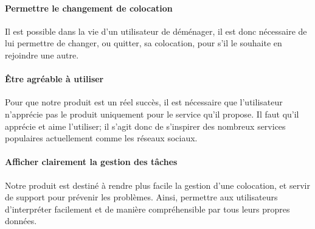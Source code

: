 \paragraph{Permettre le changement de colocation\\}
Il est possible dans la vie d'un utilisateur de déménager, il est donc nécessaire de lui permettre de changer, ou quitter, sa colocation, pour s'il le souhaite en rejoindre une autre.

\paragraph{Être agréable à utiliser\\}
Pour que notre produit est un réel succès, il est nécessaire que l'utilisateur n'apprécie pas le produit uniquement pour le service  qu'il propose. Il faut qu'il apprécie et aime l'utiliser; il s'agit donc de s'inspirer des nombreux services populaires actuellement comme les réseaux sociaux.

\paragraph{Afficher clairement la gestion des tâches\\}
Notre produit est destiné à rendre plus facile la gestion d'une colocation, et servir de support pour prévenir les problèmes. Ainsi, permettre aux utilisateurs d'interpréter facilement et de manière compréhensible par tous leurs propres données.